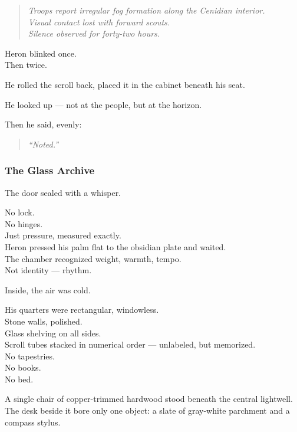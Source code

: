 \documentclass[12pt]{article}
\begin{document}
\begin{quote}
\textit{Troops report irregular fog formation along the Cenidian interior.\\
Visual contact lost with forward scouts.\\
Silence observed for forty-two hours.}
\end{quote}

Heron blinked once.\\
Then twice.

He rolled the scroll back, placed it in the cabinet beneath his seat.

He looked up — not at the people, but at the horizon.

Then he said, evenly:

\begin{quote}
\textit{“Noted.”}
\end{quote}

\dotfill

\subsubsection*{The Glass Archive}

The door sealed with a whisper.

No lock.\\
No hinges.\\
Just pressure, measured exactly.\\
Heron pressed his palm flat to the obsidian plate and waited.\\
The chamber recognized weight, warmth, tempo.\\
Not identity — rhythm.

Inside, the air was cold.

\vspace{1em}

His quarters were rectangular, windowless.\\
Stone walls, polished.\\
Glass shelving on all sides.\\
Scroll tubes stacked in numerical order — unlabeled, but memorized.\\
No tapestries.\\
No books.\\
No bed.

A single chair of copper-trimmed hardwood stood beneath the central lightwell.\\
The desk beside it bore only one object: a slate of gray-white parchment and a compass stylus.
\end{document}
